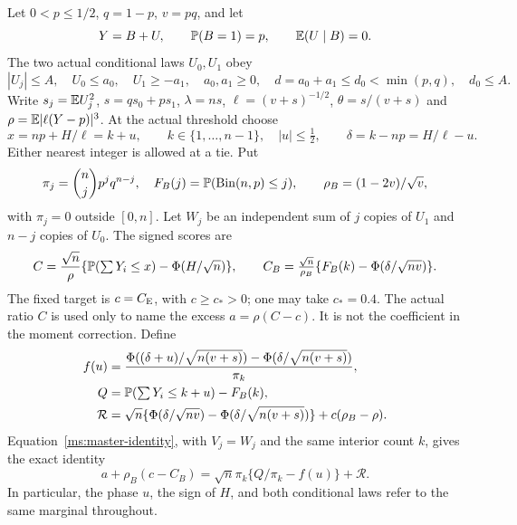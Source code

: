 Let $0<p\le1/2$, $q=1-p$, $v=pq$, and let
\[
 Y=B+U,\qquad \mathbb P(B=1)=p,\qquad \mathbb E(U\mid B)=0.
\]
The two actual conditional laws $U_0,U_1$ obey
\begin{equation}\label{ms:fourier:cut49:shortloc:support}
 |U_j|\le A,\quad U_0\le a_0,\quad U_1\ge-a_1,\quad
 a_0,a_1\ge0,\quad d=a_0+a_1\le d_0<\min(p,q),\quad d_0\le A.
\end{equation}
Write $s_j=\mathbb E U_j^2$, $s=qs_0+ps_1$, $\lambda=ns$,
$\ell=(v+s)^{-1/2}$, $\theta=s/(v+s)$ and
$\rho=\mathbb E|\ell(Y-p)|^3$. At the actual threshold choose
\[
 x=np+H/\ell=k+u,\qquad k\in\{1,\ldots,n-1\},\quad |u|\le\tfrac12,
 \qquad \delta=k-np=H/\ell-u.
\]
Either nearest integer is allowed at a tie. Put
\[
 \pi_j=\binom njp^jq^{n-j},\quad F_B(j)=\mathbb P(\operatorname{Bin}(n,p)\le j),
 \qquad \rho_B=(1-2v)/\sqrt v,
\]
with $\pi_j=0$ outside $[0,n]$. Let $W_j$ be an independent sum of $j$
copies of $U_1$ and $n-j$ copies of $U_0$. The signed scores are
\[
 C=\frac{\sqrt n}{\rho}\{\mathbb P(\textstyle\sum Y_i\le x)-\Phi(H/\sqrt n)\},
 \qquad C_B=\frac{\sqrt n}{\rho_B}\{F_B(k)-\Phi(\delta/\sqrt{nv})\}.
\]
The fixed target is $c=C_{\mathrm E}$, with $c\ge c_*>0$; one may take
$c_*=0.4$. The actual ratio $C$ is used only to name the excess
$a=\rho(C-c)$. It is not the coefficient in the moment correction.
Define
\begin{align}
 f(u)&=\frac{\Phi((\delta+u)/\sqrt{n(v+s)})-
                    \Phi(\delta/\sqrt{n(v+s)})}{\pi_k},\label{ms:fourier:cut49:shortloc:f}\\
 Q&=\mathbb P(\textstyle\sum Y_i\le k+u)-F_B(k),\nonumber\\
 \mathcal R&=\sqrt n\{\Phi(\delta/\sqrt{nv})-
                 \Phi(\delta/\sqrt{n(v+s)})\}+c(\rho_B-\rho).\nonumber
\end{align}
Equation~\eqref{ms:master-identity}, with $V_j=W_j$ and the same
interior count $k$, gives the exact identity
\begin{equation}\label{ms:fourier:cut49:shortloc:master}
 a+\rho_B(c-C_B)=\sqrt n\pi_k\{Q/\pi_k-f(u)\}+\mathcal R.
\end{equation}
In particular, the phase $u$, the sign of $H$, and both conditional laws
refer to the same marginal throughout.


